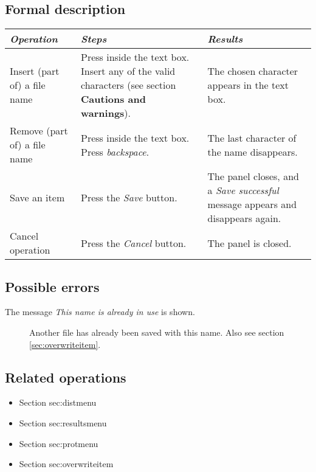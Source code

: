   \subsection*{Formal description}
    \begin{tabularx}{\textwidth}{XXX}
    \toprule
    \emph{Operation} & \emph{Steps} & \emph{Results} \\
    \midrule
    Insert (part of) a file name & Press inside the text box. Insert any of the valid characters (see section \textbf{Cautions and warnings}). & The chosen character appears in the text box. \\
    \midrule
    Remove (part of) a file name & Press inside the text box. Press \emph{backspace}. & The last character of the name disappears. \\
    \midrule
    Save an item & Press the \emph{Save} button. & The panel closes, and a \emph{Save successful} message appears and disappears again. \\
    \midrule
    Cancel operation & Press the \emph{Cancel} button. & The panel is closed. \\
    \bottomrule
\end{tabularx}

  \subsection*{Possible errors}
  \begin{description}
  \item[The message \emph{This name is already in use} is shown.] Another file has already been saved with this name. Also see section \ref{sec:overwriteitem}.
  \end{description}

  \subsection*{Related operations}
   \begin{itemize}
   \item Section {sec:distmenu}
   \item Section {sec:resultsmenu}
   \item Section {sec:protmenu}
   \item Section {sec:overwriteitem}
  \end{itemize}

